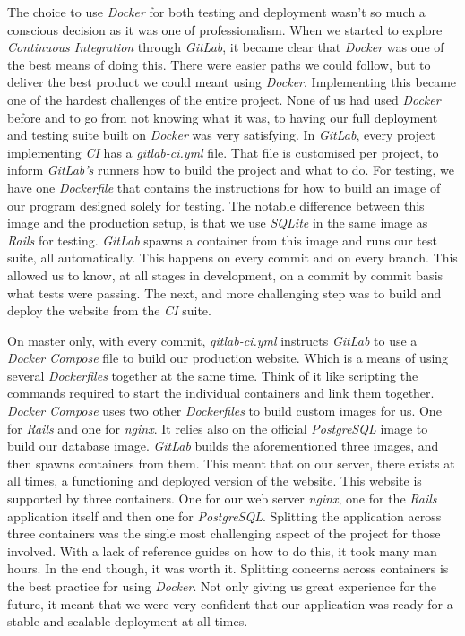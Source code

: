 \documentclass{l3proj}
\begin{document}
The choice to use \textit{Docker} for both testing and deployment wasn't so much a conscious decision as it was one of professionalism. When we started to explore \textit{Continuous Integration} through \textit{GitLab}, it became clear that \textit{Docker} was one of the best means of doing this. There were easier paths we could follow, but to deliver the best product we could meant using \textit{Docker}. Implementing this became one of the hardest challenges of the entire project. None of us had used \textit{Docker} before and to go from not knowing what it was, to having our full deployment and testing suite built on \textit{Docker} was very satisfying. In \textit{GitLab}, every project implementing \textit{CI} has a \textit{gitlab-ci.yml} file. That file is customised per project, to inform \textit{GitLab's} runners how to build the project and what to do. For testing, we have one \textit{Dockerfile} that contains the instructions for how to build an image of our program designed solely for testing. The notable difference between this image and the production setup, is that we use \textit{SQLite} in the same image as \textit{Rails} for testing. \textit{GitLab} spawns a container from this image and runs our test suite, all automatically. This happens on every commit and on every branch. This allowed us to know, at all stages in development, on a commit by commit basis what tests were passing. The next, and more challenging step was to build and deploy the website from the \textit{CI} suite.

On master only, with every commit, \textit{gitlab-ci.yml} instructs \textit{GitLab} to use a \textit{Docker Compose} file to build our production website. Which is a means of using several \textit{Dockerfiles} together at the same time. Think of it like scripting the commands required to start the individual containers and link them together. \textit{Docker Compose} uses two other \textit{Dockerfiles} to build custom images for us. One for \textit{Rails} and one for \textit{nginx}. It relies also on the official \textit{PostgreSQL}\cite{postgresql} image to build our database image. \textit{GitLab} builds the aforementioned three images, and then spawns containers from them. This meant that on our server, there exists at all times, a functioning and deployed version of the website. This website is supported by three containers. One for our web server \textit{nginx}, one for the \textit{Rails} application itself and then one for \textit{PostgreSQL}. Splitting the application across three containers was the single most challenging aspect of the project for those involved. With a lack of reference guides on how to do this, it took many man hours. In the end though, it was worth it. Splitting concerns across containers is the best practice for using \textit{Docker}. Not only giving us great experience for the future, it meant that we were very confident that our application was ready for a stable and scalable deployment at all times.
\end{document}
